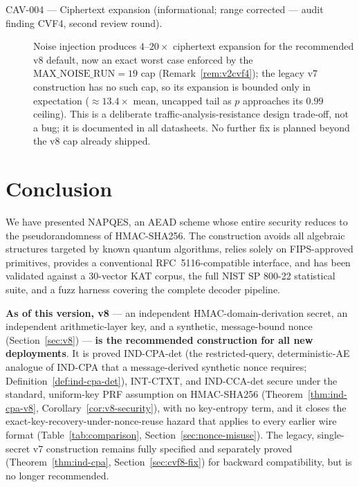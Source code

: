 \documentclass[11pt,a4paper]{article}
\begin{document}
\begin{description}
  \item[CAV-004 — Ciphertext expansion (informational; range corrected ---
        audit finding CVF4, second review round).] Noise injection produces
        $4\text{--}20\times$ ciphertext expansion for the recommended v8
        default, now an exact worst case enforced by the
        $\mathrm{MAX\_NOISE\_RUN}=19$ cap (Remark~\ref{rem:v2cvf4}); the
        legacy v7 construction has no such cap, so its expansion is bounded
        only in expectation ($\approx13.4\times$ mean, uncapped tail as $p$
        approaches its $0.99$ ceiling). This is a deliberate
        traffic-analysis-resistance design trade-off, not a bug; it is
        documented in all datasheets. No further fix is planned beyond the
        v8 cap already shipped.
\end{description}

\section{Conclusion}
\label{sec:conclusion}

We have presented NAPQES, an AEAD scheme whose entire security reduces to the
pseudorandomness of HMAC-SHA256.  The construction avoids all algebraic
structures targeted by known quantum algorithms, relies solely on FIPS-approved
primitives, provides a conventional RFC~5116-compatible interface, and has been
validated against a 30-vector KAT corpus, the full NIST SP 800-22 statistical
suite, and a fuzz harness covering the complete decoder pipeline.

\textbf{As of this version, v8} --- an independent HMAC-domain-derivation
secret, an independent arithmetic-layer key, and a synthetic, message-bound
nonce (Section~\ref{sec:v8}) --- \textbf{is the recommended construction for
all new deployments}. It is proved IND-CPA-det (the restricted-query,
deterministic-AE analogue of IND-CPA that a message-derived synthetic
nonce requires; Definition~\ref{def:ind-cpa-det}), INT-CTXT, and
IND-CCA-det secure under the standard, uniform-key PRF assumption on
HMAC-SHA256 (Theorem~\ref{thm:ind-cpa-v8}, Corollary~\ref{cor:v8-security}),
with no key-entropy term, and it closes the exact-key-recovery-under-nonce-reuse
hazard that applies to every earlier wire format (Table~\ref{tab:comparison},
Section~\ref{sec:nonce-misuse}). The legacy, single-secret v7 construction
remains fully specified and separately proved
(Theorem~\ref{thm:ind-cpa}, Section~\ref{sec:cvf8-fix}) for backward
compatibility, but is no longer recommended.
\end{document}
